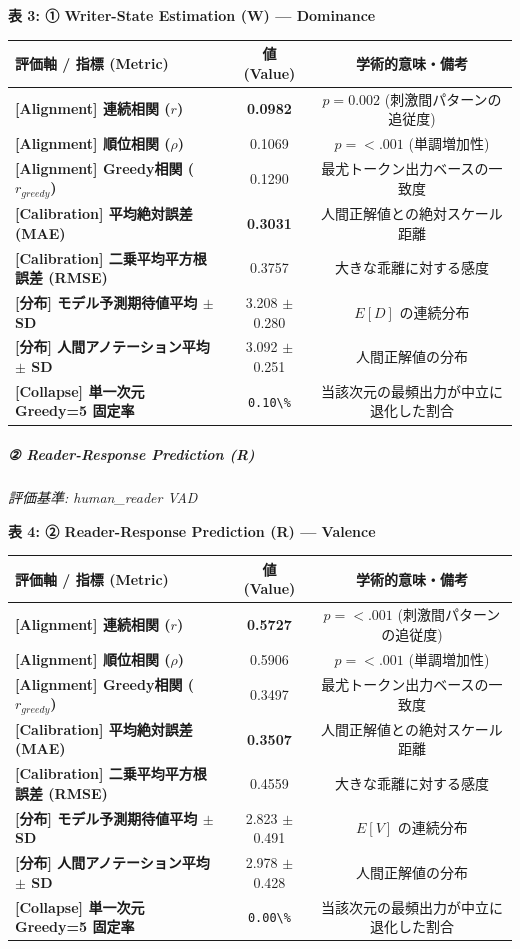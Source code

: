 \textbf{表 3: ① Writer-State Estimation (W) — Dominance}
\begin{center}
\small
\begin{tabular}{lcc}
\toprule
\textbf{評価軸 / 指標 (Metric)} & \textbf{値 (Value)} & \textbf{学術的意味・備考} \\
\midrule
\textbf{[Alignment] 連続相関 ($r$)} & \textbf{0.0982} & $p = 0.002 $ (刺激間パターンの追従度) \\
\textbf{[Alignment] 順位相関 ($\rho$)} & 0.1069 & $p = <.001 $ (単調増加性) \\
\textbf{[Alignment] Greedy相関 ($r_{greedy}$)} & 0.1290 & 最尤トークン出力ベースの一致度 \\
\textbf{[Calibration] 平均絶対誤差 (MAE)} & \textbf{0.3031} & 人間正解値との絶対スケール距離 \\
\textbf{[Calibration] 二乗平均平方根誤差 (RMSE)} & 0.3757 & 大きな乖離に対する感度 \\
\textbf{[分布] モデル予測期待値平均 $\pm$ SD} & 3.208 $\pm$ 0.280 & $E[D]$ の連続分布 \\
\textbf{[分布] 人間アノテーション平均 $\pm$ SD} & 3.092 $\pm$ 0.251 & 人間正解値の分布 \\
\textbf{[Collapse] 単一次元 Greedy=5 固定率} & \texttt{0.10\textbackslash{}\%} & 当該次元の最頻出力が中立に退化した割合 \\
\bottomrule
\end{tabular}
\end{center}


\subparagraph{② Reader-Response Prediction (R)}
\textit{評価基準: human\_reader VAD}

\textbf{表 4: ② Reader-Response Prediction (R) — Valence}
\begin{center}
\small
\begin{tabular}{lcc}
\toprule
\textbf{評価軸 / 指標 (Metric)} & \textbf{値 (Value)} & \textbf{学術的意味・備考} \\
\midrule
\textbf{[Alignment] 連続相関 ($r$)} & \textbf{0.5727} & $p = <.001 $ (刺激間パターンの追従度) \\
\textbf{[Alignment] 順位相関 ($\rho$)} & 0.5906 & $p = <.001 $ (単調増加性) \\
\textbf{[Alignment] Greedy相関 ($r_{greedy}$)} & 0.3497 & 最尤トークン出力ベースの一致度 \\
\textbf{[Calibration] 平均絶対誤差 (MAE)} & \textbf{0.3507} & 人間正解値との絶対スケール距離 \\
\textbf{[Calibration] 二乗平均平方根誤差 (RMSE)} & 0.4559 & 大きな乖離に対する感度 \\
\textbf{[分布] モデル予測期待値平均 $\pm$ SD} & 2.823 $\pm$ 0.491 & $E[V]$ の連続分布 \\
\textbf{[分布] 人間アノテーション平均 $\pm$ SD} & 2.978 $\pm$ 0.428 & 人間正解値の分布 \\
\textbf{[Collapse] 単一次元 Greedy=5 固定率} & \texttt{0.00\textbackslash{}\%} & 当該次元の最頻出力が中立に退化した割合 \\
\bottomrule
\end{tabular}
\end{center}


